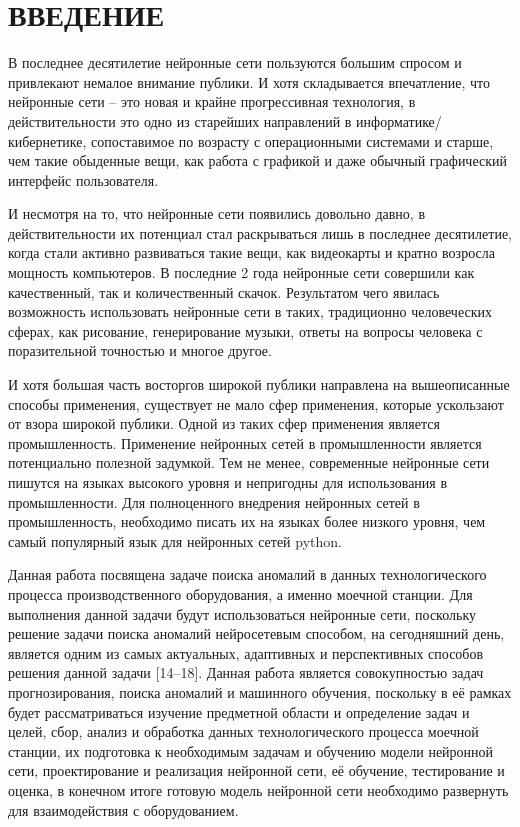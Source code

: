 \sectionbreak \section*{ 
    \gostTitleFont
    \redline
    ВВЕДЕНИЕ
}
\titlespace

{\gostFont

\par \redline 	В последнее десятилетие нейронные сети пользуются большим спросом и привлекают немалое внимание публики. И хотя складывается впечатление, что нейронные сети {--} это новая и крайне прогрессивная технология, в действительности это одно из старейших направлений в информатике/кибернетике, сопоставимое по возрасту с операционными системами и старше, чем такие обыденные вещи, как работа с графикой и даже обычный графический интерфейс пользователя.

\par \redline 	И несмотря на то, что нейронные сети появились довольно давно, в действительности их потенциал стал раскрываться лишь в последнее десятилетие, когда стали активно развиваться такие вещи, как видеокарты и кратно возросла мощность компьютеров. В последние 2 года нейронные сети совершили как качественный, так и количественный скачок. Результатом чего явилась возможность использовать нейронные сети в таких, традиционно человеческих сферах, как рисование, генерирование музыки, ответы на вопросы человека с поразительной точностью и многое другое. 


\par \redline И хотя большая часть восторгов широкой публики направлена на вышеописанные способы применения, существует не мало сфер применения, которые ускользают от взора широкой публики. Одной из таких сфер применения является промышленность. Применение нейронных сетей в промышленности является потенциально полезной задумкой. Тем не менее, современные нейронные сети пишутся на языках высокого уровня и непригодны для использования в промышленности. Для полноценного внедрения нейронных сетей в промышленность, необходимо писать их на языках более низкого уровня, чем самый популярный язык для нейронных сетей python.


\par \redline Данная работа посвящена задаче поиска аномалий в данных технологического процесса производственного оборудования, а именно моечной станции. Для выполнения данной задачи будут использоваться нейронные сети, поскольку решение задачи поиска аномалий нейросетевым способом, на сегодняшний день, является одним из самых актуальных, адаптивных и перспективных способов решения данной задачи [14{--}18]. Данная работа является совокупностью задач прогнозирования, поиска аномалий и машинного обучения, поскольку в её рамках будет рассматриваться изучение предметной области и определение задач и целей, сбор, анализ и обработка данных технологического процесса моечной станции, их подготовка к необходимым задачам и обучению модели нейронной сети, проектирование и реализация нейронной сети, её обучение, тестирование и оценка, в конечном итоге готовую модель нейронной сети необходимо развернуть для взаимодействия с оборудованием.
\par
}
